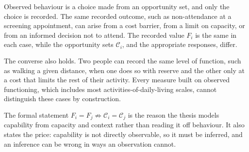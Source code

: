 \begin{reading}
Observed behaviour is a choice made from an opportunity set, and only the
choice is recorded. The same recorded outcome, such as non-attendance at a
screening appointment, can arise from a cost barrier, from a limit on capacity,
or from an informed decision not to attend. The recorded value $F_i$ is the
same in each case, while the opportunity sets $\mathcal C_i$, and the
appropriate responses, differ.

The converse also holds. Two people can record the same level of function,
such as walking a given distance, when one does so with reserve and the other
only at a cost that limits the rest of their activity. Every measure built on
observed functioning, which includes most activities-of-daily-living scales,
cannot distinguish these cases by construction.

The formal statement $F_i=F_j\not\Rightarrow\mathcal C_i=\mathcal C_j$ is the
reason the thesis models capability from capacity and context rather than
reading it off behaviour. It also states the price: capability is not directly
observable, so it must be inferred, and an inference can be wrong in ways an
observation cannot.
\end{reading}

